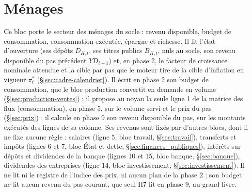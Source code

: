 \documentclass[11pt,a4paper]{article}
\begin{document}
\section{Ménages}
\label{sec:menages}
Ce bloc porte le secteur des ménages du socle : revenu disponible, budget de consommation, consommation exécutée, épargne et richesse. Il lit l'état d'ouverture (ses dépôts $D_{H,t}$, ses titres publics $B_{H,t}$, nuls au socle, son revenu disponible du pas précédent $\mathit{YD}_{t-1}$) et, en phase 2, le facteur de croissance nominale attendue et la cible par pas que le moteur tire de la cible d'inflation en vigueur $\pi^\ast_t$ (\S\ref{sec:cadre-calendrier}). Il écrit en phase 2 son budget de consommation, que le bloc production convertit en demande en volume (\S\ref{sec:production-ventes}) ; il propose au noyau la seule ligne 1 de la matrice des flux (consommation), en phase 5, sur le volume servi et le prix du pas (\S\ref{sec:prix}) ; il calcule en phase 9 son revenu disponible du pas, sur les montants exécutés des lignes de sa colonne. Ses revenus sont fixés par d'autres blocs, dont il ne fixe aucune règle : salaires (ligne 5, bloc travail, \S\ref{sec:travail}), transferts et impôts (lignes 6 et 7, bloc État et dette, \S\ref{sec:finances_publiques}), intérêts sur dépôts et dividendes de la banque (lignes 10 et 15, bloc banque, \S\ref{sec:banque}), dividendes des entreprises (ligne 14, bloc investissement, \S\ref{sec:investissement}). Il ne lit ni le registre de l'indice des prix, ni aucun plan de la phase 2 ; son budget ne lit aucun revenu du pas courant, que seul H7 lit en phase 9, au grand livre.
\end{document}
